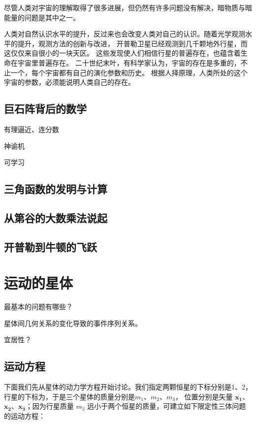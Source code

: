 \documentclass[a4paper,10.5pt]{book}
\begin{document}
尽管人类对宇宙的理解取得了很多进展，但仍然有许多问题没有解决，暗物质与暗能量的问题是其中之一。

人类对自然认识水平的提升，反过来也会改变人类对自己的认识。随着光学观测水平的提升，观测方法的创新与改进，
开普勒卫星已经观测到几千颗地外行星，而这仅仅来自很小的一块天区。
这些发现使人们相信行星的普遍存在，也蕴含着生命在宇宙里普遍存在。
二十世纪末叶，有科学家认为，宇宙的存在是多重的，不止一个，每个宇宙都有自己的演化参数和历史。
根据人择原理，人类所处的这个宇宙的参数，必须能说明人类自己的存在。

\section{巨石阵背后的数学}

有理逼近、连分数

神谕机

可学习

\section{三角函数的发明与计算}

\section{从第谷的大数乘法说起}

\section{开普勒到牛顿的飞跃}




\chapter{运动的星体}

最基本的问题有哪些？

星体间几何关系的变化导致的事件序列关系。

宜居性？

\section{运动方程}

下面我们先从星体的动力学方程开始讨论。我们指定两颗恒星的下标分别是1、2，行星的下标为，于是三个星体的质量分别是$m_1$、$m_2$、$m_3$，
位置分别是矢量 $\mathbf{x_1}$、$\mathbf{x_2}$、$\mathbf{x_3}$；因为行星质量 $m_3$ 远小于两个恒星的质量，可建立如下限定性三体问题的运动方程：
\end{document}

